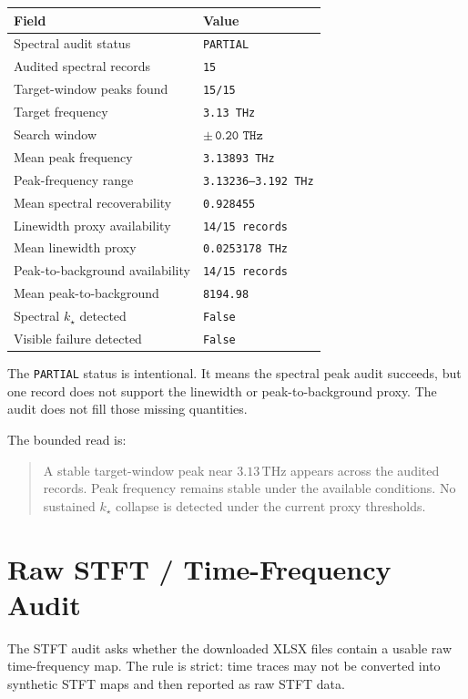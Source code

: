 \documentclass[11pt]{article}
\begin{document}
\begin{center}
\begin{tabular}{ll}
\toprule
Field & Value \\
\midrule
Spectral audit status & \texttt{PARTIAL} \\
Audited spectral records & \texttt{15} \\
Target-window peaks found & \texttt{15/15} \\
Target frequency & \texttt{3.13 THz} \\
Search window & \(\pm\,\texttt{0.20 THz}\) \\
Mean peak frequency & \texttt{3.13893 THz} \\
Peak-frequency range & \texttt{3.13236--3.192 THz} \\
Mean spectral recoverability & \texttt{0.928455} \\
Linewidth proxy availability & \texttt{14/15 records} \\
Mean linewidth proxy & \texttt{0.0253178 THz} \\
Peak-to-background availability & \texttt{14/15 records} \\
Mean peak-to-background & \texttt{8194.98} \\
Spectral \(k_\star\) detected & \texttt{False} \\
Visible failure detected & \texttt{False} \\
\bottomrule
\end{tabular}
\end{center}

The \texttt{PARTIAL} status is intentional. It means the spectral peak audit succeeds, but one record does not support the linewidth or peak-to-background proxy. The audit does not fill those missing quantities.

The bounded read is:

\begin{quote}
A stable target-window peak near \(3.13\,\mathrm{THz}\) appears across the audited records. Peak frequency remains stable under the available conditions. No sustained \(k_\star\) collapse is detected under the current proxy thresholds.
\end{quote}

\section{Raw STFT / Time-Frequency Audit}

The STFT audit asks whether the downloaded XLSX files contain a usable raw time-frequency map. The rule is strict: time traces may not be converted into synthetic STFT maps and then reported as raw STFT data.
\end{document}
